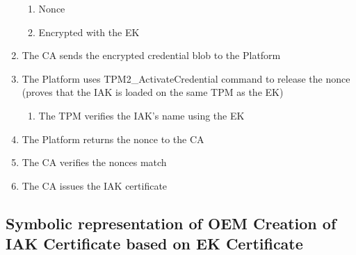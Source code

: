 \documentclass{article}
\begin{document}
\begin{enumerate}
\begin{enumerate}
        \item Nonce
        \item Encrypted with the EK
    \end{enumerate}
    \item The CA sends the encrypted credential blob to the Platform
    \item The Platform uses TPM2\_ActivateCredential command to release the nonce (proves that the IAK is loaded on the same TPM as the EK)
    \begin{enumerate}
        \item The TPM verifies the IAK's name using the EK
    \end{enumerate}
    \item The Platform returns the nonce to the CA
    \item The CA verifies the nonces match
    \item The CA issues the IAK certificate
\end{enumerate}

\subsection*{Symbolic representation of OEM Creation of IAK Certificate based on EK Certificate}
\end{document}
